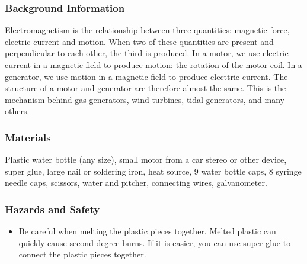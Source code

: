 \subsubsection*{Background Information}
Electromagnetism is the relationship between three quantities: magnetic force, electric current and motion.  When two of these quantities are present and perpendicular to each other, the third is produced.  In a motor, we use electric current in a magnetic field to produce motion: the rotation of the motor coil.  In a generator, we use motion in a magnetic field to produce electtric current.  The structure of a motor and generator are therefore almost the same.  This is the mechanism behind gas generators, wind turbines, tidal generators, and many others.

\subsubsection*{Materials}
Plastic water bottle (any size), small motor from a car stereo or other device, super glue, large nail or soldering iron, heat source, 9 water bottle caps, 8 syringe needle caps, scissors, water and pitcher, connecting wires, galvanometer.  

\subsubsection*{Hazards and Safety}
\begin{itemize}
\item{Be careful when melting the plastic pieces together.  Melted plastic can quickly cause second degree burns.  If it is easier, you can use super glue to connect the plastic pieces together.}
\end{itemize}

